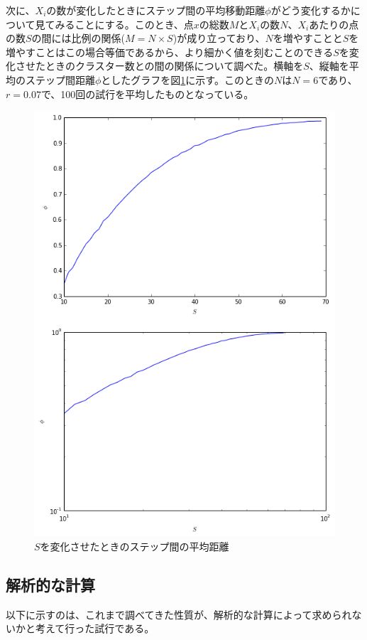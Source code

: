 次に、$X_{i}$の数が変化したときにステップ間の平均移動距離$\phi$がどう変化するかについて見てみることにする。このとき、点$x$の総数$M$と$X_{i}$の数$N$、$X_{i}$あたりの点の数$S$の間には比例の関係($M=N\times S$)が成り立っており、$N$を増やすことと$S$を増やすことはこの場合等価であるから、より細かく値を刻むことのできる$S$を変化させたときのクラスター数との間の関係について調べた。横軸を$S$、縦軸を平均のステップ間距離$\phi$としたグラフを図\ref{fig:f19}に示す。このときの$N$は$N=6$であり、$r=0.07$で、100回の試行を平均したものとなっている。
\begin{figure}[H]
    \begin{center}
        \includegraphics[width=12.5cm]{../img/S_phi_1.png}
        \caption{$S$を変化させたときのステップ間の平均距離}
        \label{fig:f19}
    \end{center}
\end{figure}

\subsection{解析的な計算}
以下に示すのは、これまで調べてきた性質が、解析的な計算によって求められないかと考えて行った試行である。

